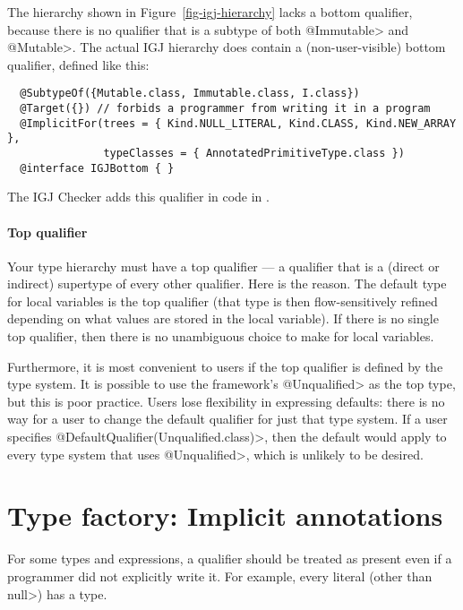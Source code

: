 The hierarchy shown in Figure~\ref{fig-igj-hierarchy} lacks
a bottom qualifier, because there is no qualifier that is a subtype of both
\<@Immutable> and \<@Mutable>.
The actual IGJ hierarchy does contain a (non-user-visible) bottom qualifier,
defined like this:

\begin{Verbatim}
  @SubtypeOf({Mutable.class, Immutable.class, I.class})
  @Target({}) // forbids a programmer from writing it in a program
  @ImplicitFor(trees = { Kind.NULL_LITERAL, Kind.CLASS, Kind.NEW_ARRAY },
               typeClasses = { AnnotatedPrimitiveType.class })
  @interface IGJBottom { }
\end{Verbatim}

The IGJ Checker adds this qualifier in code in .

\paragraph{Top qualifier\label{top-qualifier}}
Your type hierarchy must have a top qualifier
--- a qualifier that is a (direct or indirect) supertype of every other
qualifier.
Here is the reason.
The default type for local variables is the top
qualifier (that type is then flow-sensitively
refined depending on what values are stored in the local variable).
If there is no single top qualifier, then there is no
unambiguous choice to make for local variables.

Furthermore, it is most convenient to users if the top qualifier is defined
by the type system.  It is possible to use the framework's
\<@Unqualified> as the top type, but this is poor practice.
Users lose
flexibility in expressing defaults:  there is no
way for a user to change the default qualifier for just that type system.
If a user specifies
\<@DefaultQualifier(Unqualified.class)>,
then the default would apply to every
type system that uses \<@Unqualified>, which is unlikely to be desired.


\section{Type factory: Implicit annotations\label{writing-type-introduction}}

For some types and expressions, a qualifier should be treated as present
even if a programmer did not explicitly write it.  For example, every
literal (other than \<null>) has a  type.

